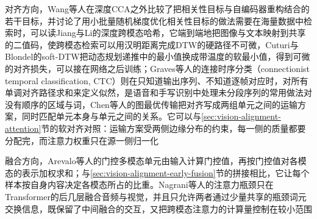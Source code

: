 对齐方向，Wang等人在深度CCA之外比较了把相关性目标与自编码器重构结合的若干目标，并讨论了用小批量随机梯度优化相关性目标的做法需要在海量数据中检索时，可以读Jiang与Li的深度跨模态哈希，它端到端地把图像与文本映射到共享的二值码，使跨模态检索可以用汉明距离完成DTW的硬路径不可微，Cuturi与Blondel的soft-DTW把动态规划递推中的最小值换成带温度的软最小值，得到可微的对齐损失，可以接在网络之后训练；Graves等人的连接时序分类（connectionist temporal classification, CTC）则在只知道输出序列、不知道逐帧对应时，对所有单调对齐路径求和来定义似然，是语音和手写识别中处理未分段序列的常用做法对没有顺序的区域与词，Chen等人的图最优传输把对齐写成两组单元之间的运输方案，同时匹配单元本身与单元之间的关系。它可以与\ref{sec:vision-alignment-attention}节的软对齐对照：运输方案受两侧边缘分布的约束，每一侧的质量都要分配完，而注意力权重只在源一侧归一化

融合方向，Arevalo等人的门控多模态单元由输入计算门控值，再按门控值对各模态的表示加权求和；与\ref{sec:vision-alignment-early-fusion}节的拼接相比，它让每个样本按自身内容决定各模态所占的比重。Nagrani等人的注意力瓶颈只在Transformer的后几层融合音频与视觉，并且只允许两者通过少量共享的瓶颈词元交换信息，既保留了中间融合的交互，又把跨模态注意力的计算量控制在较小范围
